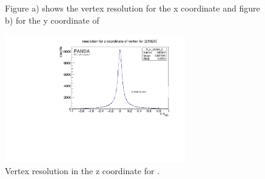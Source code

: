 	
	
	 \begin{figure}
		\centering
		\caption{\propose Figure a) shows the vertex resolution for the x coordinate and figure b) for the y coordinate of \excitedcascade}
		\label{fig:Xi1820_vtxxy}
	\end{figure}
	
	\begin{figure}
		\centering
		\includegraphics[width=0.7\textwidth]{./plots/Xi1820/XiMinus1820_vtxres_z.pdf}
		\caption{\propose Vertex resolution in the z coordinate for \excitedcascade.}
		\label{fig:Xi1820_vtxz}
	\end{figure}
	
